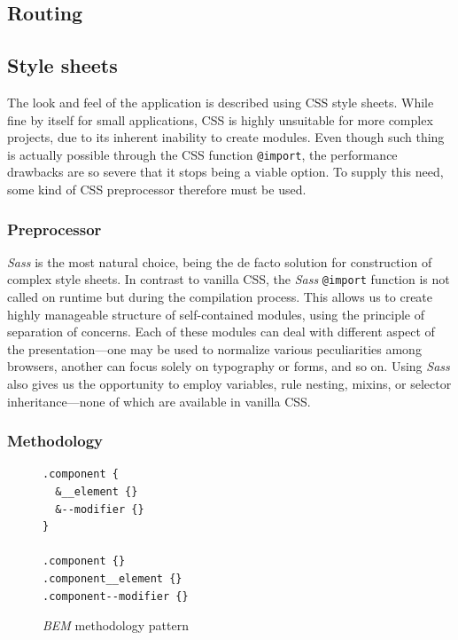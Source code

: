 \documentclass[thesis=M,english,hidelinks]{FITthesis}[2012/10/20]
\newcommand{\code}{\texttt}
\begin{document}
  \subsection{Routing}

  \subsection{Style sheets}

The look and feel of the application is described using CSS style sheets. While fine by itself for small applications, CSS is highly unsuitable for more complex projects, due to its inherent inability to create modules. Even though such thing is actually possible through the CSS function \code{@import}, the performance drawbacks are so severe that it stops being a viable option. To supply this need, some kind of CSS preprocessor therefore must be used.

    \subsubsection{Preprocessor}

\textit{Sass} is the most natural choice, being the de facto solution for construction of complex style sheets. In contrast to vanilla CSS, the \textit{Sass} \code{@import} function is not called on runtime but during the compilation process. This allows us to create highly manageable structure of self-contained modules, using the principle of separation of concerns. Each of these modules can deal with different aspect of the presentation---one may be used to normalize various peculiarities among browsers, another can focus solely on typography or forms, and so on. Using \textit{Sass} also gives us the opportunity to employ variables, rule nesting, mixins, or selector inheritance---none of which are available in vanilla CSS.

    \subsubsection{Methodology}

\begin{figure}[h]
  \begin{lstlisting}
.component {
  &__element {}
  &--modifier {}
}

.component {}
.component__element {}
.component--modifier {}
  \end{lstlisting}
  \caption{\textit{BEM} methodology pattern}
  \label{fig:bem_pattern}
\end{figure}
\end{document}
